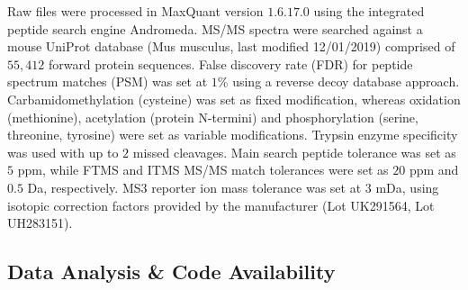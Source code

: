 \documentclass[journal=jprobs,manuscript=article]{achemso}
\begin{document}
Raw files were processed in MaxQuant\cite{cox2008maxquant} version $1.6.17.0$ using the integrated peptide search engine Andromeda\cite{cox2011andromeda}. MS/MS spectra were searched against a mouse UniProt database (Mus musculus, last modified 12/01/2019) comprised of $55{,}412$ forward protein sequences. False discovery rate (FDR) for peptide spectrum matches (PSM) was set at $1\%$ using a reverse decoy database approach. Carbamidomethylation (cysteine) was set as fixed modification, whereas oxidation (methionine), acetylation (protein N-termini) and phosphorylation (serine, threonine, tyrosine) were set as variable modifications. Trypsin enzyme specificity was used with up to $2$ missed cleavages. Main search peptide tolerance was set as $5$ ppm, while FTMS and ITMS MS/MS match tolerances were set as $20$ ppm and $0.5$ Da, respectively. MS3 reporter ion mass tolerance was set at $3$ mDa, using isotopic correction factors provided by the manufacturer (Lot UK291564, Lot UH283151). 

\subsection{Data Analysis \& Code Availability}
\end{document}
